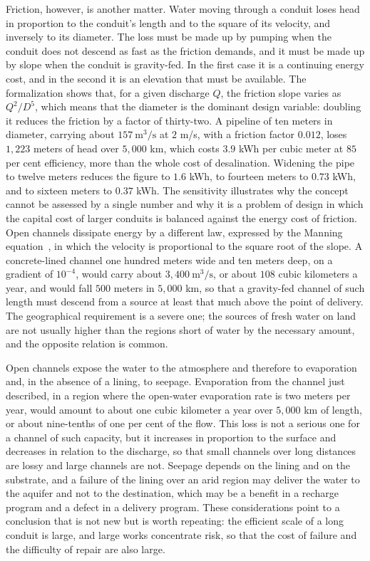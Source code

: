Friction, however, is another matter. Water moving through a conduit loses head in proportion to the conduit's length and to the square of its velocity, and inversely to its diameter. The loss must be made up by pumping when the conduit does not descend as fast as the friction demands, and it must be made up by slope when the conduit is gravity-fed. In the first case it is a continuing energy cost, and in the second it is an elevation that must be available. The formalization shows that, for a given discharge $Q$, the friction slope varies as $Q^2/D^5$, which means that the diameter is the dominant design variable: doubling it reduces the friction by a factor of thirty-two. A pipeline of ten meters in diameter, carrying about $157\ \mathrm{m^3/s}$ at $2$ m/s, with a friction factor $0.012$, loses $1{,}223$ meters of head over $5{,}000$ km, which costs $3.9$ kWh per cubic meter at $85$ per cent efficiency, more than the whole cost of desalination. Widening the pipe to twelve meters reduces the figure to $1.6$ kWh, to fourteen meters to $0.73$ kWh, and to sixteen meters to $0.37$ kWh. The sensitivity illustrates why the concept cannot be assessed by a single number and why it is a problem of design in which the capital cost of larger conduits is balanced against the energy cost of friction. Open channels dissipate energy by a different law, expressed by the Manning equation~\cite{manning1891}, in which the velocity is proportional to the square root of the slope. A concrete-lined channel one hundred meters wide and ten meters deep, on a gradient of $10^{-4}$, would carry about $3{,}400\ \mathrm{m^3/s}$, or about $108$ cubic kilometers a year, and would fall $500$ meters in $5{,}000$ km, so that a gravity-fed channel of such length must descend from a source at least that much above the point of delivery. The geographical requirement is a severe one; the sources of fresh water on land are not usually higher than the regions short of water by the necessary amount, and the opposite relation is common.

Open channels expose the water to the atmosphere and therefore to evaporation and, in the absence of a lining, to seepage. Evaporation from the channel just described, in a region where the open-water evaporation rate is two meters per year, would amount to about one cubic kilometer a year over $5{,}000$ km of length, or about nine-tenths of one per cent of the flow. This loss is not a serious one for a channel of such capacity, but it increases in proportion to the surface and decreases in relation to the discharge, so that small channels over long distances are lossy and large channels are not. Seepage depends on the lining and on the substrate, and a failure of the lining over an arid region may deliver the water to the aquifer and not to the destination, which may be a benefit in a recharge program and a defect in a delivery program. These considerations point to a conclusion that is not new but is worth repeating: the efficient scale of a long conduit is large, and large works concentrate risk, so that the cost of failure and the difficulty of repair are also large.

